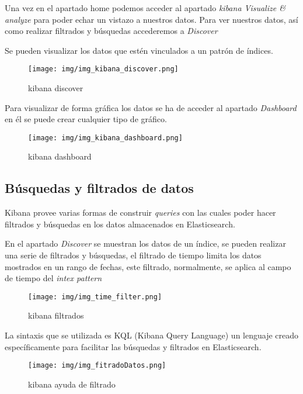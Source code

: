 Una vez en el apartado home podemos acceder al apartado \textit{kibana Visualize \& analyze} para poder echar un vistazo a nuestros datos. Para ver nuestros datos, así como realizar filtrados y búsquedas accederemos a \textit{Discover}

Se pueden visualizar los datos que estén vinculados a un patrón de índices.

\begin{figure}[h]
	\centering
	\texttt{[image: img/img\_kibana\_discover.png]}
	\caption{kibana discover}
	\label{img_kibana_discover}
\end{figure}

Para visualizar de forma gráfica los datos se ha de acceder al apartado \textit{Dashboard} en él se puede crear cualquier tipo de gráfico.

\begin{figure}[h]
	\centering
	\texttt{[image: img/img\_kibana\_dashboard.png]}
	\caption{kibana dashboard}
	\label{img_kibana_dashboard}
\end{figure}


\subsection{Búsquedas y filtrados de datos}

Kibana provee varias formas de construir \textit{queries} con las cuales poder hacer filtrados y búsquedas en los datos almacenados en Elasticsearch.

En el apartado \textit{Discover} se muestran los datos de un índice, se pueden realizar una serie de filtrados y búsquedas, el filtrado de tiempo limita los datos mostrados en un rango de fechas, este filtrado, normalmente, se aplica al campo de tiempo del \textit{intex pattern}

\begin{figure}[h]
	\centering
	\texttt{[image: img/img\_time\_filter.png]}
	\caption{kibana filtrados}
	\label{img_time_filter.png}
\end{figure}

La sintaxis que se utilizada es KQL (Kibana Query Language) un lenguaje creado específicamente para facilitar las búsquedas y filtrados en Elasticsearch. \cite{pagina:KQL}

\begin{figure}[h]
	\centering
	\texttt{[image: img/img\_fitradoDatos.png]}
	\caption{kibana ayuda de filtrado}
	\label{img_fitradoDatos.png}
\end{figure}

